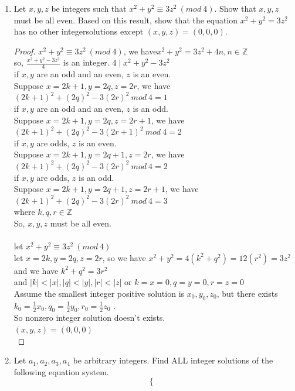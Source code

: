 \documentclass{article}
\theoremstyle{break}
\begin{document}
\begin{enumerate}
\begin{enumerate}
\end{enumerate}
\newpage
\item 
Let $x,y,z$ be integers such that $x^2+y^2 \equiv 3z^2 \ ( mod \ 4)$. Show that $x,y,z$ must be all even.  
Based on this result, show that the equation $x^2+y^2 =3z^2  $ has no other integersolutions
except $(x,y,z) = (0,0,0)$.
\begin{proof}
$x^2+y^2 \equiv 3z^2 \ ( mod \ 4)$, we have$x^2 + y^2 = 3z^2 + 4n, n \in \mathbb{Z}$\\
so, $\frac{x^2+y^2-3z^2}{4}$ is an integer. $4 \mid x^2+y^2-3z^2$\\
if $x,y$ are an odd and an even, $z$ is an even.\\
Suppose $x=2k+1,y=2q,z=2r$, we have $(2k+1)^2 + (2q)^2 - 3(2r)^2 \ mod \ 4 = 1$\\
if $x,y$ are an odd and an even, $z$ is an odd. \\
Suppose $x=2k+1,y=2q,z=2r+1$, we have $(2k+1)^2 + (2q)^2 - 3(2r+1)^2 \ mod \ 4 = 2$\\
if $x,y$ are odds, $z$ is an even.\\
Suppose $x=2k+1,y=2q+1,z=2r$, we have $(2k+1)^2 + (2q)^2 - 3(2r)^2 \ mod \ 4 = 2$\\
if $x,y$ are odds, $z$ is an odd.\\
Suppose $x=2k+1,y=2q+1,z=2r+1$, we have $(2k+1)^2 + (2q)^2 - 3(2r)^2 \ mod \ 4 = 3$\\
where $k,q,r \in \mathbb{Z}$ \\
So, $x,y,z$ must be all even.\\ \\
let $x^2+y^2 \equiv 3z^2 \ ( mod \ 4)$\\
let $x=2k,y=2q,z=2r$, so we have $x^2+y^2 = 4(k^2+q^2) = 12(r^2) = 3z^2$\\ 
and we have $k^2 + q^2 =3r^2$ \\
and $|k|<|x|, |q|<|y|, |r|<|z| $ or $k=x=0, q=y=0, r=z=0$\\
Assume the smallest integer positive solution is $x_0,y_0,z_0$, but there exists $k_0 = \frac 12 x_0, q_0 = \frac 12 y_0, r_0 = \frac 12 z_0$ .\\
So nonzero integer solution doesn't exists.\\
$(x,y,z) = (0,0,0)$ \\
\end{proof}
\newpage
\item 
Let $ a_1,a_2,a_3,a_4 $ be arbitrary integers.  Find ALL integer solutions of the following equation system.
$$
\left\{
\begin{aligned}

\end{aligned}$$
\end{enumerate}
\end{document}
